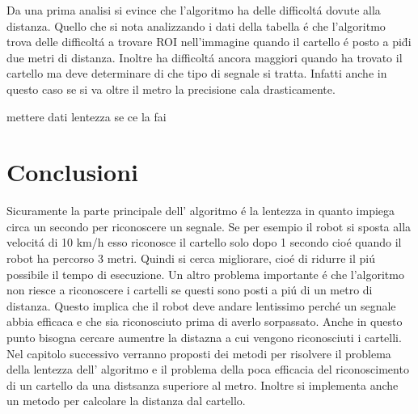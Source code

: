     Da una prima analisi si evince che l'algoritmo ha delle difficolt\'a dovute alla distanza. Quello che si nota analizzando i dati della tabella \'e che l'algoritmo trova delle difficolt\'a a trovare ROI nell'immagine quando il cartello \'e posto a pi\u di due metri di distanza. Inoltre ha difficolt\'a ancora maggiori quando ha trovato il cartello ma deve determinare di che tipo di segnale si tratta. Infatti anche in questo caso se si va oltre il metro la precisione cala drasticamente.

    mettere dati lentezza se ce la fai

\section{Conclusioni}

	Sicuramente la parte principale  dell' algoritmo \'e la lentezza in quanto impiega circa un secondo per riconoscere un segnale. Se per esempio il robot si sposta alla velocit\'a di 10 km/h esso riconosce il cartello solo dopo 1 secondo cio\'e quando il robot ha percorso 3 metri. Quindi si cerca migliorare, cio\'e di ridurre il pi\'u possibile il tempo di esecuzione. \newline 
	Un altro problema importante \'e che l'algoritmo non riesce a riconoscere i cartelli se questi sono posti a pi\'u di un metro di distanza. Questo implica che il robot deve andare lentissimo perch\'e un segnale abbia efficaca e che sia riconosciuto prima di averlo sorpassato. Anche in questo punto bisogna cercare aumentre la distazna a cui vengono riconosciuti i cartelli. \newline
	Nel capitolo successivo verranno proposti dei metodi per risolvere il problema della lentezza dell' algoritmo e il problema della poca efficacia del riconoscimento di un cartello da una distsanza superiore al metro. Inoltre si implementa anche un metodo per calcolare la distanza dal cartello.

	


